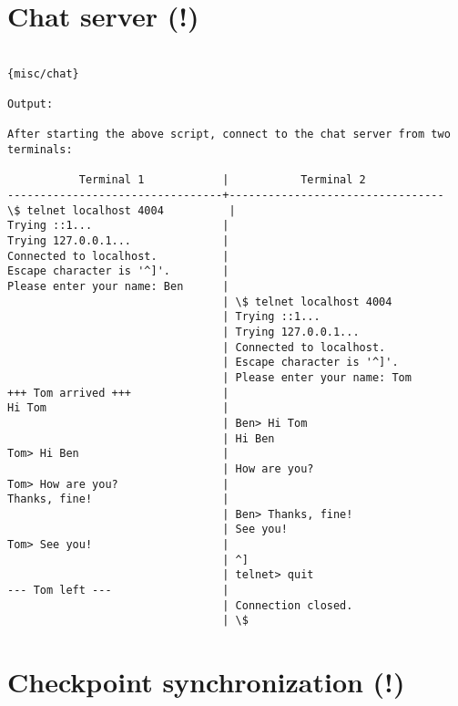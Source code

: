 \section*{Chat server (!)}

\begin{verbatim}

{misc/chat}

Output:

After starting the above script, connect to the chat server from two terminals:

           Terminal 1            |           Terminal 2
---------------------------------+---------------------------------
\$ telnet localhost 4004          |
Trying ::1...                    |
Trying 127.0.0.1...              |
Connected to localhost.          |
Escape character is '^]'.        |
Please enter your name: Ben      |
                                 | \$ telnet localhost 4004
                                 | Trying ::1...
                                 | Trying 127.0.0.1...
                                 | Connected to localhost.
                                 | Escape character is '^]'.
                                 | Please enter your name: Tom
+++ Tom arrived +++              |
Hi Tom                           |
                                 | Ben> Hi Tom
                                 | Hi Ben
Tom> Hi Ben                      |
                                 | How are you?
Tom> How are you?                |
Thanks, fine!                    |
                                 | Ben> Thanks, fine!
                                 | See you!
Tom> See you!                    |
                                 | ^]
                                 | telnet> quit
--- Tom left ---                 |
                                 | Connection closed.
                                 | \$

\end{verbatim}

\section*{Checkpoint synchronization (!)}

